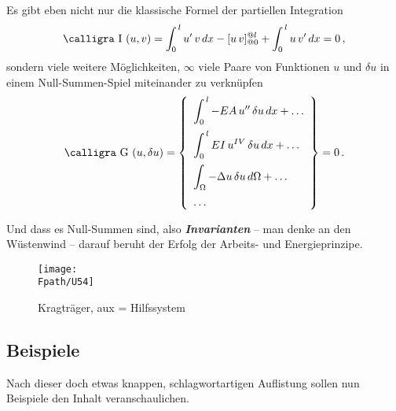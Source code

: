 {{{{Es gibt eben nicht nur die klassische Formel der partiellen Integration
\begin{align}
\text{\normalfont\calligra I\,\,}(u, v) = \int_0^{\,l} u'\,v\,dx - [u\,v]_{@0}^{@l} + \int_0^{\,l} u\,v'\,dx = 0\,,
\end{align}
sondern viele weitere M\"{o}glichkeiten, $\infty$ viele Paare von Funktionen $u$ und $\delta u$ in einem \glq Null-Summen-Spiel\grq{} miteinander zu verkn\"{u}pfen
\begin{align}
\text{\normalfont\calligra G\,\,}(u, \delta u) =  \left \{ \begin{array}{l } \displaystyle{ \int_0^{\,l} - EA\,u''\,\delta u\,dx  + \ldots}   \vspace{0.2cm} \\
 \displaystyle{\int_0^{\,l} EI\,u^{IV}\,\delta u\,dx   + \ldots} \vspace{0.2cm} \\
  \displaystyle{\int_{\Omega} - \Delta u\,\delta u\,d\Omega + \ldots} \vspace{0.2cm} \\
\ldots
\end{array} \right \} = 0\,.
\end{align}

\hspace*{-12pt}\colorbox{highlightBlue}{\parbox{0.98\textwidth}{Und dass es Null-Summen sind, also {\bf \em Invarianten\/} -- man denke an den W\"{u}stenwind -- darauf beruht der Erfolg der Arbeits- und Energieprinzipe.}}


\begin{figure}[tbp]
\centering
\if {} \sidecaption \fi
\texttt{[image: \\Fpath/U54]}
\caption{Kragtr\"{a}ger, aux = Hilfssystem} \label{U54}
\end{figure}%

{\textcolor{sectionTitleBlue}{\section{Beispiele}}}
Nach dieser doch etwas knappen, schlagwortartigen Auflistung sollen nun Beispiele den Inhalt  veranschaulichen.

}}}}
